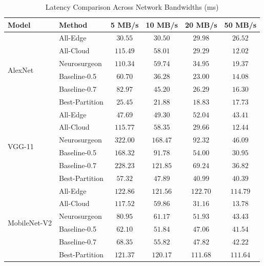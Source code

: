\begin{table}[htbp]
\centering
\caption{Latency Comparison Across Network Bandwidths (ms)}
\label{tab:network_bandwidth}
\begin{tabular}{llcccc}
\toprule
\textbf{Model} & \textbf{Method} & \textbf{5 MB/s} & \textbf{10 MB/s} & \textbf{20 MB/s} & \textbf{50 MB/s} \\
\midrule
\multirow{6}{*}{AlexNet}
 & All-Edge & $30.55$ & $30.50$ & $29.98$ & $26.52$ \\
& All-Cloud & $115.49$ & $58.01$ & $29.29$ & $12.02$ \\
& Neurosurgeon & $110.34$ & $59.74$ & $34.95$ & $19.37$ \\
& Baseline-0.5 & $60.70$ & $36.28$ & $23.00$ & $14.08$ \\
& Baseline-0.7 & $82.97$ & $45.20$ & $26.29$ & $16.30$ \\
& Best-Partition & $25.45$ & $21.88$ & $18.83$ & $17.73$ \\
\midrule
\multirow{6}{*}{VGG-11}
 & All-Edge & $47.69$ & $49.30$ & $52.04$ & $43.41$ \\
& All-Cloud & $115.77$ & $58.35$ & $29.66$ & $12.44$ \\
& Neurosurgeon & $322.00$ & $168.47$ & $92.32$ & $46.09$ \\
& Baseline-0.5 & $168.32$ & $91.78$ & $54.00$ & $30.95$ \\
& Baseline-0.7 & $228.23$ & $121.85$ & $69.24$ & $36.82$ \\
& Best-Partition & $57.32$ & $47.89$ & $40.99$ & $40.39$ \\
\midrule
\multirow{6}{*}{MobileNet-V2}
 & All-Edge & $122.86$ & $121.56$ & $122.70$ & $114.79$ \\
& All-Cloud & $117.52$ & $59.86$ & $31.16$ & $13.78$ \\
& Neurosurgeon & $80.95$ & $61.17$ & $51.93$ & $43.43$ \\
& Baseline-0.5 & $62.10$ & $51.84$ & $47.06$ & $41.54$ \\
& Baseline-0.7 & $68.35$ & $55.82$ & $47.82$ & $42.22$ \\
& Best-Partition & $121.37$ & $120.17$ & $111.68$ & $111.64$ \\
\bottomrule
\end{tabular}
\end{table}